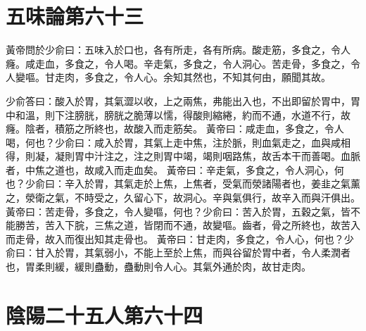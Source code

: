 \section{五味論第六十三}

黃帝問於少俞曰：五味入於口也，各有所走，各有所病。酸走筋，多食之，令人癃。咸走血，多食之，令人喝。辛走氣，多食之，令人洞心。苦走骨，多食之，令人變嘔。甘走肉，多食之，令人心。余知其然也，不知其何由，願聞其故。

少俞答曰：酸入於胃，其氣澀以收，上之兩焦，弗能出入也，不出即留於胃中，胃中和溫，則下注膀胱，膀胱之脆薄以懦，得酸則縮綣，約而不通，水道不行，故癃。陰者，積筋之所終也，故酸入而走筋矣。
黃帝曰：咸走血，多食之，令人喝，何也？少俞曰：咸入於胃，其氣上走中焦，注於脈，則血氣走之，血與咸相得，則凝，凝則胃中汁注之，注之則胃中竭，竭則咽路焦，故舌本干而善喝。血脈者，中焦之道也，故咸入而走血矣。
黃帝曰：辛走氣，多食之，令人洞心，何也？少俞曰：辛入於胃，其氣走於上焦，上焦者，受氣而滎諸陽者也，姜韭之氣薰之，滎衛之氣，不時受之，久留心下，故洞心。辛與氣俱行，故辛入而與汗俱出。
黃帝曰：苦走骨，多食之，令人變嘔，何也？少俞曰：苦入於胃，五穀之氣，皆不能勝苦，苦入下脘，三焦之道，皆閉而不通，故變嘔。齒者，骨之所終也，故苦入而走骨，故入而復出知其走骨也。
黃帝曰：甘走肉，多食之，令人心，何也？少俞曰：甘入於胃，其氣弱小，不能上至於上焦，而與谷留於胃中者，令人柔潤者也，胃柔則緩，緩則蠱動，蠱動則令人心。其氣外通於肉，故甘走肉。



\section{陰陽二十五人第六十四}

